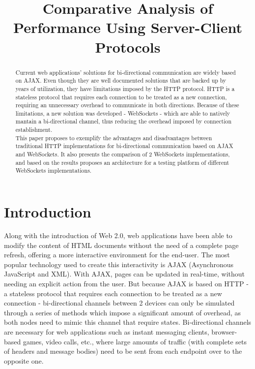\documentclass[conference]{IEEEtran}
\begin{document}
\title{Comparative Analysis of Performance Using Server-Client Protocols}

\author{
}

\maketitle

\begin{abstract}
Current web applications' solutions for bi-directional communication are widely
based on AJAX. Even though they are well documented solutions that are backed up by
years of utilization, they have limitations imposed by the HTTP protocol. HTTP
is a stateless protocol that requires each connection to be treated as a new
connection, requiring an unnecessary overhead to communicate in both directions.
Because of these limitations, a new solution was developed - WebSockets -
which are able to natively mantain a bi-directional channel, thus reducing the
overhead imposed by connection establishment.
\\
\indent
This paper proposes to exemplify the advantages and disadvantages between
traditional HTTP implementations for bi-directional communication based on AJAX
and WebSockets. It also presents the comparison of 2 WebSockets implementations,
and based on the results proposes an architecture for a testing platform of
different WebSockets implementations.
\end{abstract}

\IEEEpeerreviewmaketitle

\section{Introduction}
Along with the introduction of Web 2.0, web applications have been able to
modify the content of HTML documents without the need of a complete page
refresh, offering a more interactive environment for the end-user.
The most popular technology used to create this interactivity is AJAX \cite{AJAX}
(Asynchronous JavaScript and XML). With AJAX, pages can be updated in real-time,
without needing an explicit action from the user. But because AJAX is based on
HTTP - a stateless protocol that requires each connection to be treated as a new
connection - bi-directional channels between 2 devices can only be simulated
through a series of methods which impose a significant amount of overhead, as both
nodes need to mimic this channel that require states.
Bi-directional channels are necessary for web applications such as instant
messaging clients, browser-based games, video calls, etc., where large amounts
of traffic (with complete sets of headers and message bodies) need to be sent from
each endpoint over to the opposite one.
\\
\end{document}
